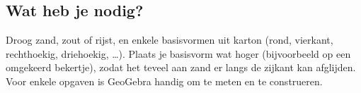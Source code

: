 \documentclass{ximera}
\begin{document}
\subsection*{Wat heb je nodig?}

Droog zand, zout of rijst, en enkele basisvormen uit karton (rond, vierkant, rechthoekig,
driehoekig, \ldots). Plaats je basisvorm wat hoger (bijvoorbeeld op een omgekeerd bekertje),
zodat het teveel aan zand er langs de zijkant kan afglijden. Voor enkele opgaven is
GeoGebra handig om te meten en te construeren.
\end{document}
